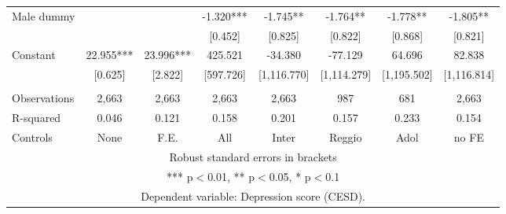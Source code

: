 \begin{tabular}{lccccccc}
Male dummy &  &  & -1.320*** & -1.745** & -1.764** & -1.778** & -1.805** \\
 &  &  & [0.452] & [0.825] & [0.822] & [0.868] & [0.821] \\
Constant & 22.955*** & 23.996*** & 425.521 & -34.380 & -77.129 & 64.696 & 82.838 \\
 & [0.625] & [2.822] & [597.726] & [1,116.770] & [1,114.279] & [1,195.502] & [1,116.814] \\
 &  &  &  &  &  &  &  \\
Observations & 2,663 & 2,663 & 2,663 & 2,663 & 987 & 681 & 2,663 \\
R-squared & 0.046 & 0.121 & 0.158 & 0.201 & 0.157 & 0.233 & 0.154 \\
 Controls & None & F.E. & All & Inter & Reggio & Adol & no FE \\ \hline
\multicolumn{8}{c}{ Robust standard errors in brackets} \\
\multicolumn{8}{c}{ *** p$<$0.01, ** p$<$0.05, * p$<$0.1} \\
\multicolumn{8}{c}{ Dependent variable: Depression score (CESD).} \\
\end{tabular}

